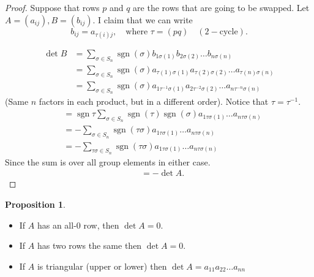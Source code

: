 \documentclass{article}
\theoremstyle{definition} \newtheorem*{definition}{Definition}
\newtheorem{proposition}[theorem]{Proposition}
\DeclareMathOperator{\sgn}{sgn} \DeclareMathOperator{\id}{id}
\begin{document}
  \begin{proof} Suppose that rows $p$ and $q$ are the rows that are going to be
    swapped. Let $A=(a_{ij}),B=(b_{ij})$. I claim that we can write \[ b_{ij} =
    a_{\tau (i) j}, \quad\text{where }\tau = (pq) \quad (2-\text{cycle}).\]

      \begin{align*} \det B &= \sum_{\sigma \in S_n} \sgn(\sigma)
        b_{1\sigma(1)}b_{2\sigma (2)}\dots b_{n \sigma (n)}\\ &= \sum_{\sigma
        \in S_n} \sgn(\sigma) a_{\tau(1)\sigma(1)}a_{\tau(2)\sigma (2)}\dots
        a_{\tau(n) \sigma (n)}\\ &= \sum_{\sigma \in S_n} \sgn(\sigma)
        a_{1\tau^{-1}\sigma(1)}a_{2\tau^{-2}\sigma (2)}\dots a_{n\tau^{-n}
      \sigma (n)} \end{align*} (Same $n$ factors in each product, but in a
    different order). Notice that $\tau = \tau^{-1}$.  \begin{align*} &=
      \sgn{\tau} \sum_{\sigma \in
      S_n}\sgn(\tau)\sgn(\sigma)a_{1\tau\sigma(1)}\dots a_{n \tau\sigma(n)} \\
      &= - \sum_{\sigma \in S_n}\sgn(\tau\sigma)a_{1\tau\sigma(1)}\dots a_{n
      \tau\sigma(n)} \\ &= - \sum_{\tau\sigma \in
      S_n}\sgn(\tau\sigma)a_{1\tau\sigma(1)}\dots a_{n \tau\sigma(n)}
    \end{align*} Since the sum is over all group elements in either case.
    \begin{align*} &= -\det A.  \end{align*} \end{proof}

  \begin{proposition}\hfill \label{prp:rowssame} \begin{itemize} \item If $A$
          has an all-0 row, then $\det A=0$.  \item If $A$ has two rows the
          same then $\det A=0$.  \item If $A$ is triangular (upper or lower)
            then $\det A=a_{11}a_{22}\dots a_{nn}$ \end{itemize}


  \end{proposition}
\end{document}
